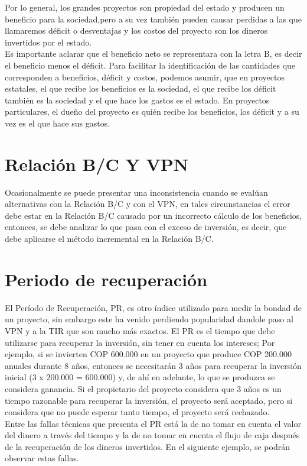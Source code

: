 Por lo general, los grandes proyectos son propiedad del estado y producen un beneficio para la sociedad,pero a su vez también pueden causar perdidas a las que llamaremos déficit  o desventajas y los costos del proyecto son los dineros invertidos por el estado.
\\
Es importante aclarar que el beneficio neto se representara con la letra B, es decir el beneficio menos el déficit. Para facilitar la identificación de las cantidades que corresponden a beneficios, déficit  y costos, podemos asumir, que en proyectos estatales, el que recibe los beneficios es la sociedad, el que recibe los déficit  también es la sociedad y el que hace los gastos es el estado. En proyectos particulares, el dueño del proyecto es quién recibe los beneficios, los déficit  y a su vez es el que hace sus gastos.
\\




\section{Relación B/C Y VPN}
Ocasionalmente se puede presentar una inconsistencia cuando se evalúan alternativas con la Relación B/C y con el VPN, en tales circunstancias el error debe estar en la Relación B/C causado por un incorrecto cálculo de los beneficios, entonces, se debe analizar lo que pasa con el exceso de inversión, es decir, que debe aplicarse el método incremental en la Relación B/C.
\\




\section{Periodo de recuperación}
El Período de Recuperación, PR, es otro índice utilizado para medir la bondad de un proyecto, sin embargo este ha venido perdiendo popularidad dandole paso al VPN y a la TIR que son mucho más exactos. El PR es el tiempo que debe utilizarse para recuperar la inversión, sin tener en cuenta los intereses; Por ejemplo, si se invierten  COP 600.000 en un proyecto que produce  COP 200.000 anuales durante 8 años, entonces se necesitarán 3 años para recuperar la inversión inicial (3 x 200.000 = 600.000) y, de ahí en adelante, lo que se produzca se considera ganancia. Si el propietario del proyecto considera que 3 años es un tiempo razonable para recuperar la inversión, el proyecto será aceptado, pero si considera que no puede esperar tanto tiempo, el proyecto será rechazado.\\

Entre las fallas técnicas que presenta el PR está la de no tomar en cuenta el valor del dinero a través del tiempo y la de no tomar en cuenta el flujo de caja después de la recuperación de los dineros invertidos. En el siguiente ejemplo, se podrán observar estas fallas.\\


